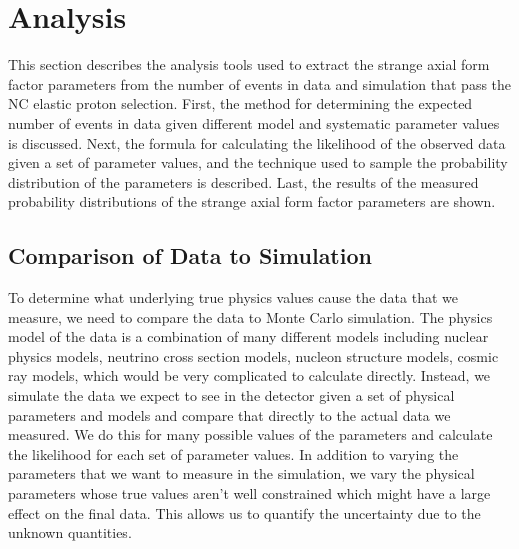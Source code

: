 \section{Analysis}\label{sec:analysis}
\hspace{\parindent}
This section describes the analysis tools used to extract the strange axial
form factor parameters from the number of events in data and simulation that
pass the NC elastic proton selection. First, the method for determining the
expected number of events in data given different model and systematic
parameter values is discussed. Next, the formula for calculating the likelihood
of the observed data given a set of parameter values, and the technique used to
sample the probability distribution of the parameters is described. Last, the
results of the measured probability distributions of the strange axial form
factor parameters are shown.

\subsection{Comparison of Data to Simulation}
  To determine what underlying true physics values cause the data that we
  measure, we need to compare the data to Monte Carlo simulation. The physics
  model of the data is a combination of many different models including nuclear
  physics models, neutrino cross section models, nucleon structure models,
  cosmic ray models, which would be very complicated to calculate directly.
  Instead, we simulate the data we expect to see in the detector given a set of
  physical parameters and models and compare that directly to the actual data
  we measured. We do this for many possible values of the parameters and
  calculate the likelihood for each set of parameter values. In addition to
  varying the parameters that we want to measure in the simulation, we vary the
  physical parameters whose true values aren't well constrained which might
  have a large effect on the final data. This allows us to quantify the
  uncertainty due to the unknown quantities.
